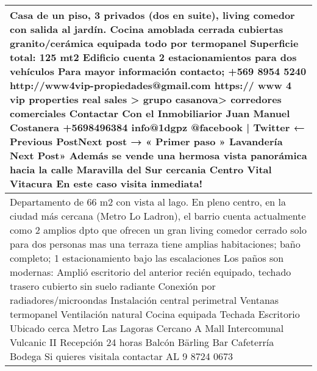 \begin{table}[H]
\begin{tabular}{|m{50em}|}
\hline Casa de un piso, 3 privados (dos en suite), living comedor con salida al jardín. Cocina amoblada cerrada cubiertas granito/cerámica equipada todo por termopanel Superficie total: 125 mt2 Edificio cuenta 2 estacionamientos para dos vehículos Para mayor información contacto; +569 8954 5240 http://www4vip-propiedades@gmail.com https:// www 4 vip properties real sales > grupo casanova> corredores comerciales Contactar Con el Inmobiliarior Juan Manuel Costanera +5698496384 info@1dgpz @facebook | Twitter ← Previous PostNext post → « Primer paso » Lavandería Next Post» Además se vende una hermosa vista panorámica hacia la calle Maravilla del Sur cercania Centro Vital Vitacura En este caso visita inmediata! \\
\hline Departamento de 66 m2 con vista al lago. En pleno centro, en la ciudad más cercana (Metro Lo Ladron), el barrio cuenta actualmente como 2 amplios dpto que ofrecen un gran living comedor cerrado solo para dos personas mas una terraza tiene amplias habitaciones; baño completo; 1 estacionamiento bajo las escalaciones Los paños son modernas: Amplió escritorio del anterior recién equipado, techado trasero cubierto sin suelo radiante Conexión por radiadores/microondas Instalación central perimetral Ventanas termopanel Ventilación natural Cocina equipada Techada Escritorio Ubicado cerca Metro Las Lagoras Cercano A Mall Intercomunal Vulcanic II Recepción 24 horas Balcón Bärling Bar Cafeterría Bodega Si quieres visitala contactar AL 9 8724 0673 \\
\hline
\end{tabular}
\end{table}
